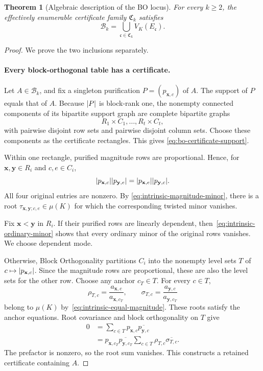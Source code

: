 \documentclass[11pt]{article}
\theoremstyle{plain}
\newtheorem{theorem}{Theorem}[section]
\theoremstyle{definition}
\theoremstyle{remark}
\DeclarePairedDelimiter{\abs}{\lvert}{\rvert}
\begin{document}
\begin{theorem}[Algebraic description of the BO locus]
\label{thm:finite-bo-certificates}
For every $k\ge2$, the effectively enumerable certificate family
$\mathfrak C_k$ satisfies
\begin{equation}
  \mathcal B_k
  =\bigcup_{\mathfrak c\in\mathfrak C_k}V_K(E_{\mathfrak c}).
  \label{eq:bo-certificate-union}
\end{equation}
\end{theorem}

\begin{proof}
We prove the two inclusions separately.

\paragraph{Every block-orthogonal table has a certificate.}
Let $A\in\mathcal B_k$, and fix a singleton purification
$P=(p_{\mathbf x,c})$ of $A$.  The support of $P$ equals that of $A$.
Because $\abs P$ is block-rank one, the nonempty connected components of its
bipartite support graph are complete bipartite graphs
\[
  R_1\times C_1,\ldots,R_t\times C_t,
\]
with pairwise disjoint row sets and pairwise disjoint column sets.  Choose
these components as the certificate rectangles.  This gives
\eqref{eq:bo-certificate-support}.

Within one rectangle, purified magnitude rows are proportional.  Hence, for
$\mathbf x,\mathbf y\in R_i$ and $c,e\in C_i$,
\[
  \abs{p_{\mathbf x,c}}\abs{p_{\mathbf y,e}}
  =\abs{p_{\mathbf x,e}}\abs{p_{\mathbf y,c}}.
\]
All four original entries are nonzero.  By
\eqref{eq:intrinsic-magnitude-minor}, there is a root
$\tau_{\mathbf x,\mathbf y;c,e}\in\mu(K)$ for which the corresponding
twisted minor vanishes.

Fix $\mathbf x<\mathbf y$ in $R_i$.  If their purified rows are linearly
dependent, then~\eqref{eq:intrinsic-ordinary-minor} shows that every ordinary
minor of the original rows vanishes.  We choose dependent mode.

Otherwise, Block Orthogonality partitions $C_i$ into the nonempty level sets
$T$ of $c\mapsto\abs{p_{\mathbf x,c}}$.  Since the magnitude rows are
proportional, these are also the level sets for the other row.  Choose any
anchor $c_T\in T$.  For every $c\in T$,
\[
  \rho_{T,c}=\frac{a_{\mathbf x,c}}{a_{\mathbf x,c_T}},
  \qquad
  \sigma_{T,c}=\frac{a_{\mathbf y,c}}{a_{\mathbf y,c_T}}
\]
belong to $\mu(K)$ by~\eqref{eq:intrinsic-equal-magnitude}.  These roots
satisfy the anchor equations.  Root covariance and block orthogonality on
$T$ give
\begin{align*}
  0
  &=\sum_{c\in T}p_{\mathbf x,c}\overline{p_{\mathbf y,c}}\\
  &=p_{\mathbf x,c_T}\overline{p_{\mathbf y,c_T}}
    \sum_{c\in T}\rho_{T,c}\overline{\sigma_{T,c}}.
\end{align*}
The prefactor is nonzero, so the root sum vanishes.  This constructs a
retained certificate containing $A$.


\end{proof}
\end{document}
